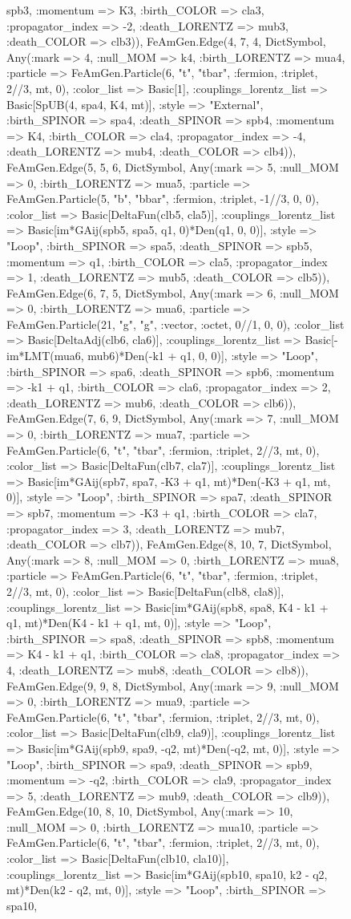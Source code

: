 \documentclass{revtex4}
\begin{document}
\begin{figure}[!htb]
\begin{center}
{spb3, :momentum => K3, :birth_COLOR => cla3, :propagator_index => -2, :death_LORENTZ => mub3, :death_COLOR => clb3)), FeAmGen.Edge(4, 7, 4, Dict{Symbol, Any}(:mark => 4, :null_MOM => k4, :birth_LORENTZ => mua4, :particle => FeAmGen.Particle(6, "t", "tbar", :fermion, :triplet, 2//3, mt, 0), :color_list => Basic[1], :couplings_lorentz_list => Basic[SpUB(4, spa4, K4, mt)], :style => "External", :birth_SPINOR => spa4, :death_SPINOR => spb4, :momentum => K4, :birth_COLOR => cla4, :propagator_index => -4, :death_LORENTZ => mub4, :death_COLOR => clb4)), FeAmGen.Edge(5, 5, 6, Dict{Symbol, Any}(:mark => 5, :null_MOM => 0, :birth_LORENTZ => mua5, :particle => FeAmGen.Particle(5, "b", "bbar", :fermion, :triplet, -1//3, 0, 0), :color_list => Basic[DeltaFun(clb5, cla5)], :couplings_lorentz_list => Basic[im*GAij(spb5, spa5, q1, 0)*Den(q1, 0, 0)], :style => "Loop", :birth_SPINOR => spa5, :death_SPINOR => spb5, :momentum => q1, :birth_COLOR => cla5, :propagator_index => 1, :death_LORENTZ => mub5, :death_COLOR => clb5)), FeAmGen.Edge(6, 7, 5, Dict{Symbol, Any}(:mark => 6, :null_MOM => 0, :birth_LORENTZ => mua6, :particle => FeAmGen.Particle(21, "g", "g", :vector, :octet, 0//1, 0, 0), :color_list => Basic[DeltaAdj(clb6, cla6)], :couplings_lorentz_list => Basic[-im*LMT(mua6, mub6)*Den(-k1 + q1, 0, 0)], :style => "Loop", :birth_SPINOR => spa6, :death_SPINOR => spb6, :momentum => -k1 + q1, :birth_COLOR => cla6, :propagator_index => 2, :death_LORENTZ => mub6, :death_COLOR => clb6)), FeAmGen.Edge(7, 6, 9, Dict{Symbol, Any}(:mark => 7, :null_MOM => 0, :birth_LORENTZ => mua7, :particle => FeAmGen.Particle(6, "t", "tbar", :fermion, :triplet, 2//3, mt, 0), :color_list => Basic[DeltaFun(clb7, cla7)], :couplings_lorentz_list => Basic[im*GAij(spb7, spa7, -K3 + q1, mt)*Den(-K3 + q1, mt, 0)], :style => "Loop", :birth_SPINOR => spa7, :death_SPINOR => spb7, :momentum => -K3 + q1, :birth_COLOR => cla7, :propagator_index => 3, :death_LORENTZ => mub7, :death_COLOR => clb7)), FeAmGen.Edge(8, 10, 7, Dict{Symbol, Any}(:mark => 8, :null_MOM => 0, :birth_LORENTZ => mua8, :particle => FeAmGen.Particle(6, "t", "tbar", :fermion, :triplet, 2//3, mt, 0), :color_list => Basic[DeltaFun(clb8, cla8)], :couplings_lorentz_list => Basic[im*GAij(spb8, spa8, K4 - k1 + q1, mt)*Den(K4 - k1 + q1, mt, 0)], :style => "Loop", :birth_SPINOR => spa8, :death_SPINOR => spb8, :momentum => K4 - k1 + q1, :birth_COLOR => cla8, :propagator_index => 4, :death_LORENTZ => mub8, :death_COLOR => clb8)), FeAmGen.Edge(9, 9, 8, Dict{Symbol, Any}(:mark => 9, :null_MOM => 0, :birth_LORENTZ => mua9, :particle => FeAmGen.Particle(6, "t", "tbar", :fermion, :triplet, 2//3, mt, 0), :color_list => Basic[DeltaFun(clb9, cla9)], :couplings_lorentz_list => Basic[im*GAij(spb9, spa9, -q2, mt)*Den(-q2, mt, 0)], :style => "Loop", :birth_SPINOR => spa9, :death_SPINOR => spb9, :momentum => -q2, :birth_COLOR => cla9, :propagator_index => 5, :death_LORENTZ => mub9, :death_COLOR => clb9)), FeAmGen.Edge(10, 8, 10, Dict{Symbol, Any}(:mark => 10, :null_MOM => 0, :birth_LORENTZ => mua10, :particle => FeAmGen.Particle(6, "t", "tbar", :fermion, :triplet, 2//3, mt, 0), :color_list => Basic[DeltaFun(clb10, cla10)], :couplings_lorentz_list => Basic[im*GAij(spb10, spa10, k2 - q2, mt)*Den(k2 - q2, mt, 0)], :style => "Loop", :birth_SPINOR => spa10, }
\end{center}
\end{figure}
\end{document}
